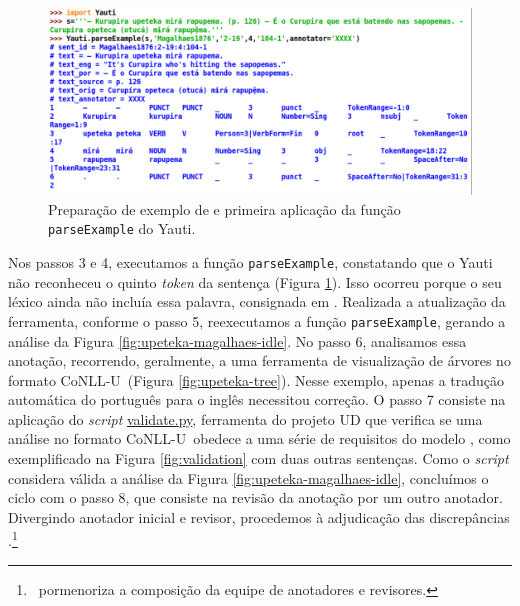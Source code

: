 \documentclass[portuguese]{textolivre}
\newcommand{\conll}{CoNLL-U}
\newcommand{\vquatro}{\textcite{de-alencar-2024-universal-k}}
\begin{document}
\begin{figure}[htbp]
  \centering
  \begin{minipage}{.75\textwidth}
    \includegraphics[width=\linewidth]{figures/unknown-word-idle.pdf}
    \caption{Preparação de exemplo de \textcite[p. 126]{magalhaes1876} e primeira aplicação da função \texttt{parseExample} do Yauti.}
    \label{fig:unknown-word-idle}
  \end{minipage}
\end{figure}

Nos passos 3 e 4, executamos a função \texttt{parseExample}, constatando que o Yauti não reconheceu o quinto \textit{token} da sentença (Figura \ref{fig:unknown-word-idle}). Isso ocorreu porque o seu léxico ainda não incluía essa palavra, consignada em \textcite{avila2021}. Realizada a atualização da ferramenta, conforme o passo 5, reexecutamos a função \texttt{parseExample}, gerando a análise da Figura \ref{fig:upeteka-magalhaes-idle}. No passo 6, analisamos essa anotação, recorrendo, geralmente, a uma ferramenta de visualização de árvores no formato \conll~(Figura \ref{fig:upeteka-tree}). Nesse exemplo, apenas a tradução automática do português para o inglês necessitou correção. O passo 7 consiste na aplicação do \textit{script} \href{https://github.com/UniversalDependencies/tools/blob/master/validate.py}{validate.py}, ferramenta do projeto UD que verifica se uma análise no formato \conll~obedece a uma série de requisitos do modelo \parencite{UDValidation2024}, como exemplificado na Figura \ref{fig:validation} com duas outras sentenças. Como o \textit{script} considera válida a análise da Figura \ref{fig:upeteka-magalhaes-idle}, concluímos o ciclo com o passo 8, que consiste na revisão da anotação por um outro anotador. Divergindo anotador inicial e revisor, procedemos à adjudicação das discrepâncias \parencite{hirschmann2019korpuslinguistik}.\footnote{\vquatro~pormenoriza a composição da equipe de anotadores e revisores.}  
\end{document}
